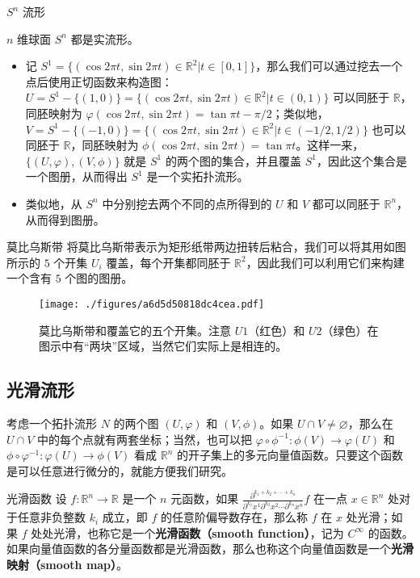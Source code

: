 \begin{example}{$S^n$ 流形}

$n$ 维球面 $S^n$ 都是实流形。
\begin{itemize}
\item 记 $S^1=\{(\cos{2\pi t},\sin{2\pi t})\in\mathbb{R}^2|t\in[0, 1]\}$，那么我们可以通过挖去一个点后使用正切函数来构造图：$U=S^1-\{(1,0)\}=\{(\cos{2\pi t},\sin{2\pi t})\in\mathbb{R}^2|t\in(0, 1)\}$ 可以同胚于 $\mathbb{R}$，同胚映射为 $\varphi(\cos{2\pi t},\sin{2\pi t})=\tan{\pi t-\pi/2}$；类似地，$V=S^1-\{(-1, 0)\}=\{(\cos{2\pi t},\sin{2\pi t})\in\mathbb{R}^2|t\in(-1/2, 1/2)\}$ 也可以同胚于 $\mathbb{R}$，同胚映射为 $\phi(\cos{2\pi t},\sin{2\pi t})= \tan{\pi t}$。这样一来，$\{(U, \varphi), (V, \phi)\}$ 就是 $S^1$ 的两个图的集合，并且覆盖 $S^1$，因此这个集合是一个图册，从而得出 $S^1$ 是一个实拓扑流形。
\item 类似地，从 $S^n$ 中分别挖去两个不同的点所得到的 $U$ 和 $V$ 都可以同胚于 $\mathbb{R}^n$，从而得到图册。


\end{itemize}

\end{example}

\begin{example}{莫比乌斯带}
将莫比乌斯带表示为矩形纸带两边扭转后粘合，我们可以将其用如图所示的 $5$ 个开集 $U_i$ 覆盖，每个开集都同胚于 $\mathbb{R}^2$，因此我们可以利用它们来构建一个含有 $5$ 个图的图册。
\begin{figure}[ht]
\centering
\texttt{[image: ./figures/a6d5d50818dc4cea.pdf]}
\caption{莫比乌斯带和覆盖它的五个开集。注意 $U1$（红色）和 $U2$（绿色）在图示中有“两块”区域，当然它们实际上是相连的。} \label{fig_Manif_1}
\end{figure}
\end{example}

\subsection{光滑流形}

考虑一个拓扑流形 $N$ 的两个图 $(U, \varphi)$ 和 $(V, \phi)$。如果 $U\cap V\not=\varnothing$，那么在 $U\cap V$ 中的每个点就有两套坐标；当然，也可以把 $\varphi\circ\phi^{-1}:\phi(V)\rightarrow\varphi(U)$ 和 $\phi\circ\varphi^{-1}:\varphi(U)\rightarrow\phi(V)$ 看成 $\mathbb{R}^n$ 的开子集上的多元向量值函数。只要这个函数是可以任意进行微分的，就能方便我们研究。

\begin{definition}{光滑函数}
设 $f:\mathbb{R}^n\rightarrow\mathbb{R}$ 是一个 $n$ 元函数，如果 $\frac{\partial^{k_1+k_2+\cdots+k_n}}{\partial^{k_1}x^1\partial^{k_2}x^2\cdots\partial^{k_n}x^n} f$ 在一点 $x\in\mathbb{R}^n$ 处对于任意非负整数 $k_i$ 成立，即 $f$ 的任意阶偏导数存在，那么称 $f$ 在 $x$ 处光滑；如果 $f$ 处处光滑，也称它是一个\textbf{光滑函数（smooth function）}，记为 $C^\infty$ 的函数。如果向量值函数的各分量函数都是光滑函数，那么也称这个向量值函数是一个\textbf{光滑映射（smooth map）}。
\end{definition}

